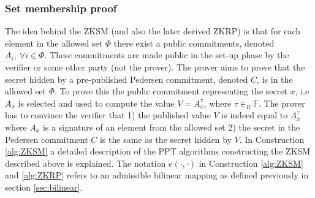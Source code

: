 \subsubsection*{Set membership proof}
The idea behind the ZKSM (and also the later derived ZKRP) is that for each element in the allowed set $\Phi$ there exist a public commitments, denoted $A_i, \: \forall i\in\Phi$.  These commitments are made public in the set-up phase by the verifier or some other party (not the prover). The prover aims to prove that the secret hidden by a pre-published Pedersen commitment, denoted $C$, is in the allowed set $\Phi$. To prove this the public commitment representing the secret $x$, i.e $A_x$  is selected and  used to compute the value $V = A_x^\tau$, where $\tau\in_R\mathds{F}$. The prover has to convince the verifier that  1) the published value $V$ is indeed equal to  $A_x^\tau$ where $A_x$ is a signature of an element from the allowed set  2) the secret in the Pedersen commitment $C$  is the same as the secret hidden by $V$.
In Construction \ref{alg:ZKSM} a detailed description of the  PPT algorithms constructing  the ZKSM described above is explained. The notation $e(\cdot,\cdot)$ in Construction \ref{alg:ZKSM} and \ref{alg:ZKRP} refers to an admissible bilinear mapping as defined previously in section \ref{sec:bilinear}.
